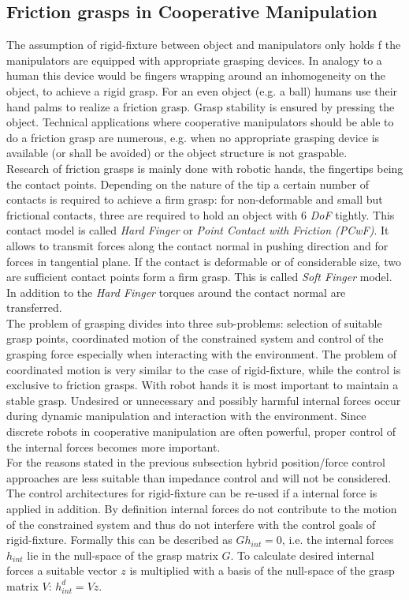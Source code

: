 \documentclass[a4paper,twoside, openright,12pt]{report}
\begin{document}
\subsection{Friction grasps in Cooperative Manipulation}
The assumption of rigid-fixture between object and manipulators only holds f the manipulators are equipped with  appropriate grasping devices. In analogy to a human this device would be fingers wrapping around an inhomogeneity on the object, to achieve a rigid grasp. For an even object (e.g. a ball) humans use their hand palms to realize a friction grasp. Grasp stability is ensured by pressing the object. Technical applications where cooperative manipulators should be able to do a friction grasp are numerous, e.g. when no appropriate grasping device is available (or shall be avoided) or the object structure is not graspable.\\
Research of friction grasps is mainly done with robotic hands, the fingertips being the contact points. Depending on the nature of the tip a certain number of contacts is required to achieve a firm grasp: for non-deformable and small but frictional contacts, three are required to hold an object with 6 \emph{DoF} tightly. This contact model is called \emph{Hard Finger} or \emph{Point Contact with Friction (PCwF)}. It allows to transmit forces along the contact normal in pushing direction and for forces in tangential plane. If the contact is deformable or of considerable size, two are sufficient contact points form a firm grasp. This is called \emph{Soft Finger} model. In addition to the \emph{Hard Finger} torques around the contact normal are transferred.\\
The problem of grasping divides into three sub-problems: selection of suitable grasp points, coordinated motion of the constrained system and control of the grasping force especially when interacting with the environment. The problem of coordinated motion is very similar to the case of rigid-fixture, while the control is exclusive to friction grasps. With robot hands it is most important to maintain a stable grasp. Undesired or unnecessary and possibly harmful internal forces occur during dynamic manipulation and interaction with the environment. Since discrete robots in cooperative manipulation are often powerful, proper control of the internal forces becomes more important.\\
For the reasons stated in the previous subsection hybrid position/force control approaches are less suitable than impedance control and will not be considered. The control architectures for rigid-fixture can be re-used if a internal force is applied in addition. By definition internal forces do not contribute to the motion of the constrained system and thus do not interfere with the control goals of rigid-fixture. Formally this can be described as $ G h_{int} = 0 $, i.e. the internal forces $ h_{int} $ lie in the null-space of the grasp matrix $ G $. To calculate desired internal forces a suitable vector $ z $ is multiplied with a basis of the null-space of the grasp matrix $ V $: $ h_{int}^d = V z $.\\
\end{document}
